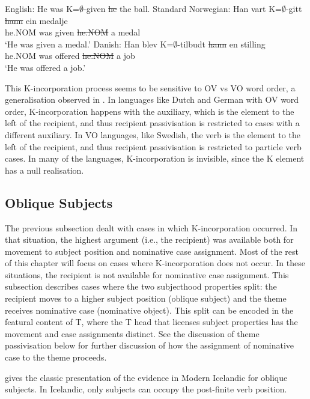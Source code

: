 \begin{exe}
	\ex English: He was K=$\emptyset$-given \sout{he} the ball.
	\ex Standard Norwegian:
	\gll Han vart K=$\emptyset$-gitt \sout{hann} ein medalje\\
	he.NOM was given \sout{he.NOM} a medal\\
	\trans `He was given a medal.'
	\ex Danish:
	\gll Han blev K=$\emptyset$-tilbudt \sout{hann} en stilling\\
	he.NOM was offered \sout{he.NOM} a job\\
	\trans `He was offered a job.'
\end{exe}

This K-incorporation process seems to be sensitive to OV vs VO word order, a generalisation observed in \cite{Sprouse.1995}. In languages like Dutch and German with OV word order, K-incorporation happens with the auxiliary, which is the element to the left of the recipient, and thus recipient passivisation is restricted to cases with a different auxiliary. In VO languages, like Swedish, the verb is the element to the left of the recipient, and thus recipient passivisation is restricted to particle verb cases. In many of the languages, K-incorporation is invisible, since the K element has a null realisation.

\subsection{Oblique Subjects}
The previous subsection dealt with cases in which K-incorporation occurred. In that situation, the highest argument (i.e., the recipient) was available both for movement to subject position and nominative case assignment. Most of the rest of this chapter will focus on cases where K-incorporation does not occur. In these situations, the recipient is not available for nominative case assignment. This subsection describes cases where the two subjecthood properties split: the recipient moves to a higher subject position (oblique subject) and the theme receives nominative case (nominative object). This split can be encoded in the featural content of T, where the T head that licenses subject properties has the movement and case assignments distinct. See the discussion of theme passivisation below for further discussion of how the assignment of nominative case to the theme proceeds.

\cite{Zaenen.1985} gives the classic presentation of the evidence in Modern Icelandic for oblique subjects. In Icelandic, only subjects can occupy the post-finite verb position.

